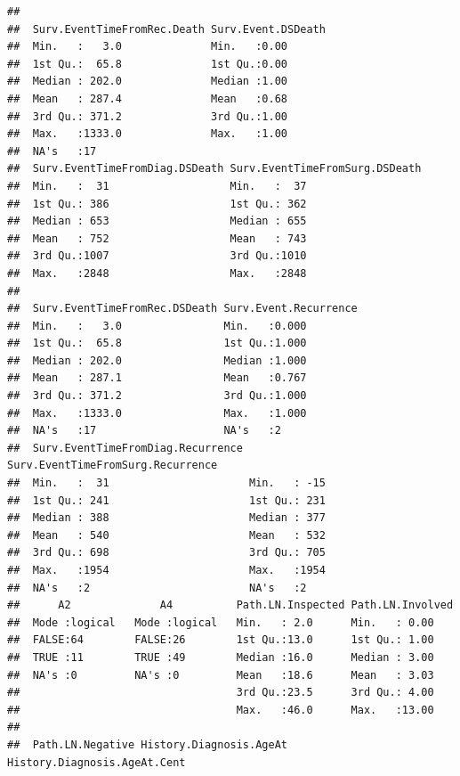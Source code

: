 \documentclass{article}\usepackage[]{graphicx}\usepackage[]{color}
\makeatletter
\newenvironment{kframe}{%
 \def\at@end@of@kframe{}%
 \ifinner\ifhmode%
  \def\at@end@of@kframe{\end{minipage}}%
  \begin{minipage}{\columnwidth}%
 \fi\fi%
 \def\FrameCommand##1{\hskip\@totalleftmargin \hskip-\fboxsep
 \colorbox{shadecolor}{##1}\hskip-\fboxsep
     \hskip-\linewidth \hskip-\@totalleftmargin \hskip\columnwidth}%
 \MakeFramed {\advance\hsize-\width
   \@totalleftmargin\z@ \linewidth\hsize
   \@setminipage}}%
 {\par\unskip\endMakeFramed%
 \at@end@of@kframe}
\newenvironment{knitrout}{}{} %
\makeatother
\begin{document}
\begin{knitrout}
\begin{kframe}
\begin{verbatim}
##                                                           
##  Surv.EventTimeFromRec.Death Surv.Event.DSDeath
##  Min.   :   3.0              Min.   :0.00      
##  1st Qu.:  65.8              1st Qu.:0.00      
##  Median : 202.0              Median :1.00      
##  Mean   : 287.4              Mean   :0.68      
##  3rd Qu.: 371.2              3rd Qu.:1.00      
##  Max.   :1333.0              Max.   :1.00      
##  NA's   :17                                    
##  Surv.EventTimeFromDiag.DSDeath Surv.EventTimeFromSurg.DSDeath
##  Min.   :  31                   Min.   :  37                  
##  1st Qu.: 386                   1st Qu.: 362                  
##  Median : 653                   Median : 655                  
##  Mean   : 752                   Mean   : 743                  
##  3rd Qu.:1007                   3rd Qu.:1010                  
##  Max.   :2848                   Max.   :2848                  
##                                                               
##  Surv.EventTimeFromRec.DSDeath Surv.Event.Recurrence
##  Min.   :   3.0                Min.   :0.000        
##  1st Qu.:  65.8                1st Qu.:1.000        
##  Median : 202.0                Median :1.000        
##  Mean   : 287.1                Mean   :0.767        
##  3rd Qu.: 371.2                3rd Qu.:1.000        
##  Max.   :1333.0                Max.   :1.000        
##  NA's   :17                    NA's   :2            
##  Surv.EventTimeFromDiag.Recurrence Surv.EventTimeFromSurg.Recurrence
##  Min.   :  31                      Min.   : -15                     
##  1st Qu.: 241                      1st Qu.: 231                     
##  Median : 388                      Median : 377                     
##  Mean   : 540                      Mean   : 532                     
##  3rd Qu.: 698                      3rd Qu.: 705                     
##  Max.   :1954                      Max.   :1954                     
##  NA's   :2                         NA's   :2                        
##      A2              A4          Path.LN.Inspected Path.LN.Involved
##  Mode :logical   Mode :logical   Min.   : 2.0      Min.   : 0.00   
##  FALSE:64        FALSE:26        1st Qu.:13.0      1st Qu.: 1.00   
##  TRUE :11        TRUE :49        Median :16.0      Median : 3.00   
##  NA's :0         NA's :0         Mean   :18.6      Mean   : 3.03   
##                                  3rd Qu.:23.5      3rd Qu.: 4.00   
##                                  Max.   :46.0      Max.   :13.00   
##                                                                    
##  Path.LN.Negative History.Diagnosis.AgeAt History.Diagnosis.AgeAt.Cent

\end{verbatim}
\end{kframe}
\end{knitrout}
\end{document}
